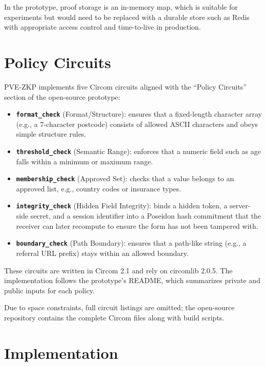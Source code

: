 \documentclass[conference]{IEEEtran}
\begin{document}
In the prototype, proof storage is an in-memory map, which is suitable for
experiments but would need to be replaced with a durable store such as Redis
with appropriate access control and time-to-live in production.

\section{Policy Circuits}

PVE-ZKP implements five Circom circuits aligned with the ``Policy Circuits''
section of the open-source prototype:

\begin{itemize}[leftmargin=*]
  \item \textbf{\texttt{format\_check}} (Format/Structure): ensures that a
    fixed-length character array (e.g., a 7-character postcode) consists of
    allowed ASCII characters and obeys simple structure rules.
  \item \textbf{\texttt{threshold\_check}} (Semantic Range): enforces that a
    numeric field such as age falls within a minimum or maximum range.
  \item \textbf{\texttt{membership\_check}} (Approved Set): checks that a
    value belongs to an approved list, e.g., country codes or insurance types.
  \item \textbf{\texttt{integrity\_check}} (Hidden Field Integrity): binds a
    hidden token, a server-side secret, and a session identifier into a Poseidon
    hash commitment that the receiver can later recompute to ensure the form has
    not been tampered with.
  \item \textbf{\texttt{boundary\_check}} (Path Boundary): ensures that a
    path-like string (e.g., a referral URL prefix) stays within an allowed
    boundary.
\end{itemize}

These circuits are written in Circom 2.1 and rely on circomlib 2.0.5. The
implementation follows the prototype's README, which summarizes private and
public inputs for each policy.

Due to space constraints, full circuit listings are omitted; the open-source
repository contains the complete Circom files along with build scripts.

\section{Implementation}
\end{document}
